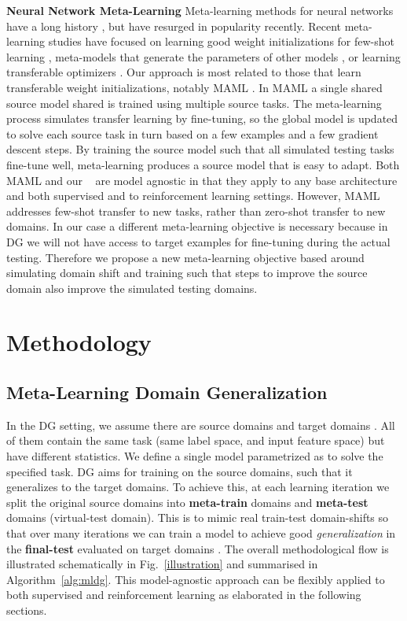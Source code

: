 \documentclass[letterpaper]{article} \usepackage{aaai18}  \usepackage{times}  \usepackage{helvet}  \usepackage{courier}  \usepackage{url}  \usepackage{graphicx}  \usepackage{amsmath}
\newcommand{\name}[1]{MLDG}
\newcommand{\keypoint}[1]{\vspace{0.1cm}\noindent\textbf{#1}\quad}
\begin{document}
\keypoint{Neural Network Meta-Learning} Meta-learning methods for neural networks have a long history \cite{thrun1998learntolearn,schmidhuber1997inductiveBias}, but have resurged in popularity recently. 
Recent meta-learning studies have focused on learning good weight initializations for few-shot learning \cite{finn2017model,parisotto2016transferRL}, meta-models that generate the parameters of other models \cite{vinyals2016oneShot,da2017dg}, or learning transferable optimizers \cite{ravi2016optimization,andrychowicz2016learning}. Our approach is most related to those that learn transferable weight initializations, notably MAML \cite{finn2017model}. In MAML a single shared source model shared is trained using multiple source tasks. The meta-learning process simulates transfer learning by fine-tuning, so the global model is updated to solve each source task in turn based on a few examples and a few gradient descent steps. By training the source model such that all simulated testing tasks fine-tune well, meta-learning produces a source model that is easy to adapt. Both MAML and our \name ~ are model agnostic in that they apply to any base architecture and both supervised and to reinforcement learning settings. However, MAML addresses few-shot transfer to new tasks, rather than zero-shot transfer to new domains. In our case a different meta-learning objective is necessary because in DG we will not have access to target examples for fine-tuning during the actual testing. Therefore we propose a new meta-learning objective based around simulating domain shift and training such that steps to improve the source domain also improve the simulated testing domains.





\section{Methodology}

\subsection{Meta-Learning Domain Generalization}

In the DG setting, we assume there are  source domains  and  target domains . All of them contain the same task (same label space, and input feature space) but have different statistics. 
We define a single model parametrized as  to solve the specified task. DG aims for training  on the source domains, such that it generalizes to the target domains. To achieve this, at each learning iteration we split the original  source domains  into  \textbf{meta-train} domains  and  \textbf{meta-test} domains  (virtual-test domain). This is to mimic real train-test domain-shifts so that over many iterations we can train a model to achieve good \textit{generalization} in the \textbf{final-test} evaluated on target domains . The overall methodological flow is illustrated schematically in Fig.~\ref{illustration} and summarised in Algorithm~\ref{alg:mldg}. This model-agnostic approach can be flexibly applied to both supervised and reinforcement learning as elaborated in the following sections.
\end{document}
